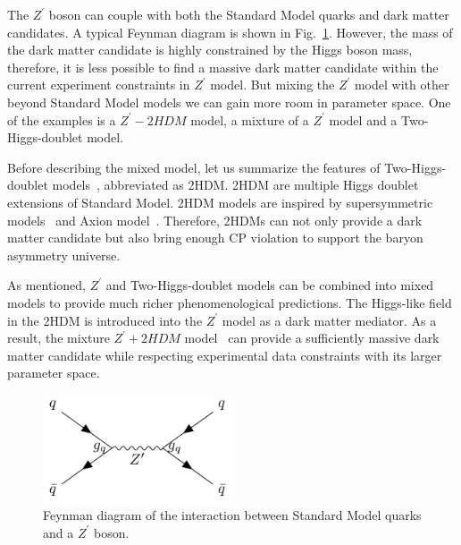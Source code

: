 \par The $Z^\prime$ boson can couple with both the Standard Model quarks and dark matter candidates. A typical Feynman diagram is shown in Fig.~\ref{fig:c2zprime}. However, the mass of the dark matter candidate is highly constrained by the Higgs boson mass, therefore, it is less possible to find a massive dark matter candidate within the current experiment constraints in $Z^{\prime}$ model. But mixing the $Z^{\prime}$ model with other beyond Standard Model models we can gain more room in parameter space. One of the examples is a $Z^{\prime}-2HDM$ model, a mixture of a $Z^{\prime}$ model and a Two-Higgs-doublet model.

\par Before describing the mixed model, let us summarize the features of Two-Higgs-doublet models~\cite{Branco:2011iw}, abbreviated as 2HDM. 2HDM are multiple Higgs doublet extensions of Standard Model. 2HDM models are inspired by supersymmetric models~\cite{Martin:1997ns} and Axion model~\cite{Peccei:2006as}. Therefore, 2HDMs can not only provide a dark matter candidate but also bring enough CP violation to support the baryon asymmetry universe.


\par As mentioned, $Z^{\prime}$ and Two-Higgs-doublet models can be combined into mixed models to provide much richer phenomenological predictions. The Higgs-like field in the 2HDM is introduced into the $Z^{\prime}$ model as a dark matter mediator. As a result, the mixture $Z^{\prime}+2HDM$ model~\cite{Berlin:2014cfa} can provide a sufficiently massive dark matter candidate while respecting experimental data constraints with its larger parameter space.

\begin{figure}[htbp]
    \centering
    \includegraphics[width=0.5\textwidth]{chapters/c2/figures/z-prime}
    \caption{Feynman diagram of the interaction between Standard Model quarks and a $Z^{\prime}$ boson.}
    \label{fig:c2zprime}
\end{figure}

